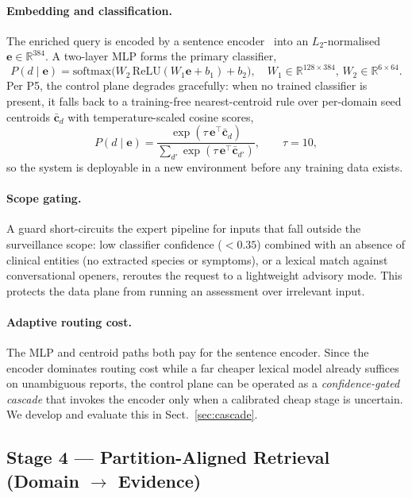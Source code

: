 \documentclass[runningheads]{llncs}
\begin{document}
\paragraph{Embedding and classification.}
The enriched query is encoded by a sentence encoder~\cite{reimers2019} into an $L_2$-normalised $\mathbf{e}\in\mathbb{R}^{384}$. A two-layer MLP forms the primary classifier,
\begin{equation}
P(d\mid\mathbf{e}) = \mathrm{softmax}\!\big(W_2\,\mathrm{ReLU}(W_1\mathbf{e}+b_1)+b_2\big),\quad W_1\in\mathbb{R}^{128\times384},\,W_2\in\mathbb{R}^{6\times64}.
\end{equation}
Per P5, the control plane degrades gracefully: when no trained classifier is present, it falls back to a training-free nearest-centroid rule over per-domain seed centroids $\bar{\mathbf{c}}_d$ with temperature-scaled cosine scores,
\begin{equation}
P(d\mid\mathbf{e}) = \frac{\exp(\tau\,\mathbf{e}^{\top}\bar{\mathbf{c}}_d)}{\sum_{d'}\exp(\tau\,\mathbf{e}^{\top}\bar{\mathbf{c}}_{d'})},\qquad \tau=10,
\end{equation}
so the system is deployable in a new environment before any training data exists.

\paragraph{Scope gating.}
A guard short-circuits the expert pipeline for inputs that fall outside the surveillance scope: low classifier confidence ($<0.35$) combined with an absence of clinical entities (no extracted species or symptoms), or a lexical match against conversational openers, reroutes the request to a lightweight advisory mode. This protects the data plane from running an assessment over irrelevant input.

\paragraph{Adaptive routing cost.}
The MLP and centroid paths both pay for the sentence encoder. Since the encoder dominates routing cost while a far cheaper lexical model already suffices on unambiguous reports, the control plane can be operated as a \emph{confidence-gated cascade} that invokes the encoder only when a calibrated cheap stage is uncertain. We develop and evaluate this in Sect.~\ref{sec:cascade}.

\subsection{Stage 4 --- Partition-Aligned Retrieval (Domain $\rightarrow$ Evidence)}
\end{document}
